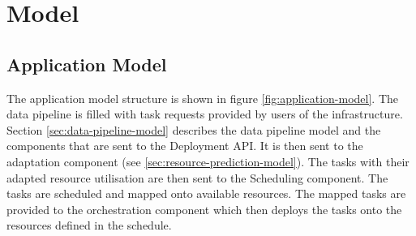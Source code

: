 \chapter{Model} %
\label{ch:model-methodology}


    \section{Application Model}
    \label{sec:application-model}






    The application model structure is shown in figure \ref{fig:application-model}.
    The data pipeline is filled with task requests provided by users of the infrastructure.
    Section \ref{sec:data-pipeline-model} describes the data pipeline model and the components that are sent to the Deployment API. It is then sent to the adaptation component (see \ref{sec:resource-prediction-model}). The tasks with their adapted resource utilisation are then sent to the Scheduling component. 
    The tasks are scheduled and mapped onto available resources. 
    The mapped tasks are provided to the orchestration component which then deploys the tasks onto the resources defined in the schedule.



